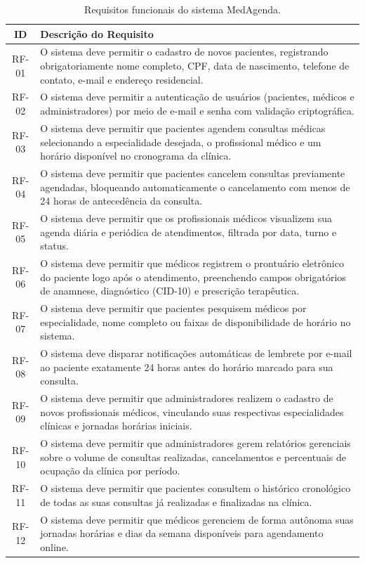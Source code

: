 \begin{table}[htbp]
\centering
\small
\caption{Requisitos funcionais do sistema MedAgenda.}
\label{tab:rf}
\begin{tabularx}{\textwidth}{|c|>{\RaggedRight\arraybackslash}X|}
\hline
\textbf{ID} & \textbf{Descrição do Requisito} \\
\hline
RF-01 & O sistema deve permitir o cadastro de novos pacientes, registrando obrigatoriamente nome completo, CPF, data de nascimento, telefone de contato, e-mail e endereço residencial. \\
\hline
RF-02 & O sistema deve permitir a autenticação de usuários (pacientes, médicos e administradores) por meio de e-mail e senha com validação criptográfica. \\
\hline
RF-03 & O sistema deve permitir que pacientes agendem consultas médicas selecionando a especialidade desejada, o profissional médico e um horário disponível no cronograma da clínica. \\
\hline
RF-04 & O sistema deve permitir que pacientes cancelem consultas previamente agendadas, bloqueando automaticamente o cancelamento com menos de 24 horas de antecedência da consulta. \\
\hline
RF-05 & O sistema deve permitir que os profissionais médicos visualizem sua agenda diária e periódica de atendimentos, filtrada por data, turno e status. \\
\hline
RF-06 & O sistema deve permitir que médicos registrem o prontuário eletrônico do paciente logo após o atendimento, preenchendo campos obrigatórios de anamnese, diagnóstico (CID-10) e prescrição terapêutica. \\
\hline
RF-07 & O sistema deve permitir que pacientes pesquisem médicos por especialidade, nome completo ou faixas de disponibilidade de horário no sistema. \\
\hline
RF-08 & O sistema deve disparar notificações automáticas de lembrete por e-mail ao paciente exatamente 24 horas antes do horário marcado para sua consulta. \\
\hline
RF-09 & O sistema deve permitir que administradores realizem o cadastro de novos profissionais médicos, vinculando suas respectivas especialidades clínicas e jornadas horárias iniciais. \\
\hline
RF-10 & O sistema deve permitir que administradores gerem relatórios gerenciais sobre o volume de consultas realizadas, cancelamentos e percentuais de ocupação da clínica por período. \\
\hline
RF-11 & O sistema deve permitir que pacientes consultem o histórico cronológico de todas as suas consultas já realizadas e finalizadas na clínica. \\
\hline
RF-12 & O sistema deve permitir que médicos gerenciem de forma autônoma suas jornadas horárias e dias da semana disponíveis para agendamento online. \\
\hline
\end{tabularx}\\
\autoria
\end{table}

